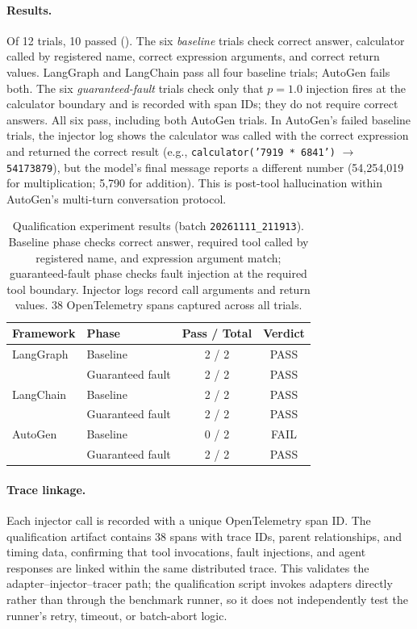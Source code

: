 \documentclass[make,article,submit,moreauthors,pdftex]{mdpi}
\begin{document}
{\paragraph{Results.} Of 12 trials, 10 passed (). The six \emph{baseline} trials check correct answer, calculator called by registered name, correct expression arguments, and correct return values. LangGraph and LangChain pass all four baseline trials; AutoGen fails both. The six \emph{guaranteed-fault} trials check only that $p = 1.0$ injection fires at the calculator boundary and is recorded with span IDs; they do not require correct answers. All six pass, including both AutoGen trials. In AutoGen's failed baseline trials, the injector log shows the calculator was called with the correct expression and returned the correct result (e.g., \texttt{calculator('7919 * 6841')} $\to$ \texttt{54173879}), but the model's final message reports a different number (54{,}254{,}019 for multiplication; 5{,}790 for addition). This is post-tool hallucination within AutoGen's multi-turn conversation protocol.}

\begin{table}[htbp]
\caption{Qualification experiment results (batch \texttt{20261111\_211913}). Baseline phase checks correct answer, required tool called by registered name, and expression argument match; guaranteed-fault phase checks fault injection at the required tool boundary. Injector logs record call arguments and return values. 38 OpenTelemetry spans captured across all trials.}\label{tab:qualification}
\centering
\begin{tabular}{llcc}
\toprule
\textbf{Framework} & \textbf{Phase} & \textbf{Pass / Total} & \textbf{Verdict} \\
\midrule
LangGraph  & Baseline          & 2 / 2 & PASS \\
           & Guaranteed fault  & 2 / 2 & PASS \\
LangChain  & Baseline          & 2 / 2 & PASS \\
           & Guaranteed fault  & 2 / 2 & PASS \\
AutoGen    & Baseline          & 0 / 2 & FAIL \\
           & Guaranteed fault  & 2 / 2 & PASS \\
\bottomrule
\end{tabular}
\end{table}

\paragraph{Trace linkage.} Each injector call is recorded with a unique OpenTelemetry span ID. The qualification artifact contains 38 spans with trace IDs, parent relationships, and timing data, confirming that tool invocations, fault injections, and agent responses are linked within the same distributed trace. This validates the adapter--injector--tracer path; the qualification script invokes adapters directly rather than through the benchmark runner, so it does not independently test the runner's retry, timeout, or batch-abort logic.
\end{document}
